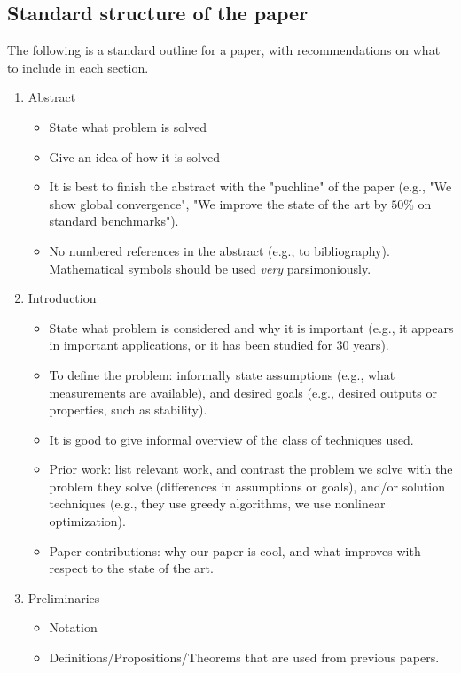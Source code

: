 \documentclass[letterpaper, 10 pt, conference]{ieeeconf}
\begin{document}
\subsection{Standard structure of the paper}
The following is a standard outline for a paper, with recommendations on what to include in each section.
\begin{enumerate}
\item Abstract
  \begin{itemize}
  \item State what problem is solved
  \item Give an idea of how it is solved
  \item It is best to finish the abstract with the "puchline" of the paper (e.g., "We show global convergence", "We improve the state of the art by $50\%$ on standard benchmarks").
  \item No numbered references in the abstract (e.g., to bibliography). Mathematical symbols should be used \emph{very} parsimoniously.
  \end{itemize}
\item Introduction
  \begin{itemize}
  \item State what problem is considered and why it is important (e.g., it
    appears in important applications, or it has been studied for 30 years).
  \item To define the problem: informally state assumptions (e.g., what measurements are available), and desired goals (e.g., desired outputs or properties, such as stability).
  \item It is good to give informal overview of the class of techniques used.
  \item Prior work: list relevant work, and contrast the problem we solve with the problem they solve (differences in assumptions or goals), and/or solution techniques (e.g., they use greedy algorithms, we use nonlinear optimization). 
  \item Paper contributions: why our paper is cool, and what improves with respect to the state of the art.
  \end{itemize}
\item Preliminaries
  \begin{itemize}
  \item Notation
  \item Definitions/Propositions/Theorems that are used from previous papers.

\end{itemize}
\end{enumerate}
\end{document}
